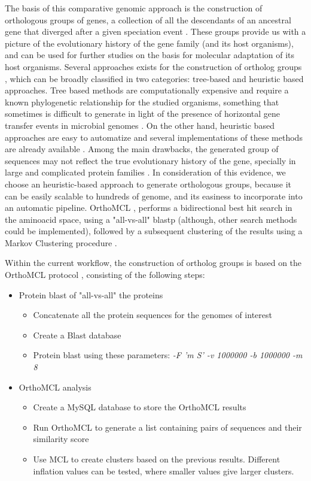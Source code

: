 The basis of this comparative genomic approach is the construction of orthologous groups of genes, a collection of all the descendants of an ancestral gene that diverged after a given speciation event  \cite{Kristensen:2011gw}. These groups provide us with a picture of the evolutionary history of the gene family (and its host organisms), and can be used for further studies on the basis for molecular adaptation of its host organisms.
Several approaches exists for the construction of ortholog groups \cite{Kristensen:2011gw}, which can be broadly classified in two categories: tree-based and heuristic based approaches. Tree based methods are computationally expensive and require a known phylogenetic relationship for the studied organisms, something that sometimes is difficult to generate in light of the presence of horizontal gene transfer events in microbial genomes \cite{Koonin:2001vz}. On the other hand, heuristic based approaches are easy to automatize and several implementations of these methods are already available \cite{Kristensen:2011gw}. Among the main drawbacks, the generated group of sequences may not reflect the true evolutionary history of the gene, specially in large and complicated protein families \cite{Chen:2007kk}.
In consideration of this evidence, we choose an heuristic-based approach to generate orthologous groups, because it can be easily scalable to hundreds of genome, and its easiness to incorporate into an automatic pipeline. OrthoMCL \cite{Li:2003en}, performs a bidirectional best hit search in the aminoacid space, using a "all-vs-all" blastp (although, other search methods could be implemented), followed by a subsequent clustering of the results using a Markov Clustering procedure \cite{Enright:2002uq}.

Within the current workflow, the construction of ortholog groups is based on the OrthoMCL protocol \cite{Li:2003en}, consisting of the following steps: 
\begin{itemize}
\item Protein blast of "all-vs-all" the proteins
	\begin{itemize}
	\item Concatenate all the protein sequences for the genomes of interest
	\item Create a Blast database
	\item Protein blast using these parameters: \textit{-F 'm S' -v 1000000 -b 1000000 -m 8}
	\end{itemize}
\item OrthoMCL analysis
	\begin{itemize}
	\item Create a MySQL database to store the OrthoMCL results
	\item Run OrthoMCL to generate a list containing pairs of sequences and their similarity score
	\item Use MCL to create clusters based on the previous results. Different inflation values can be tested, where smaller values give larger clusters.
	\end{itemize}
\end{itemize}

